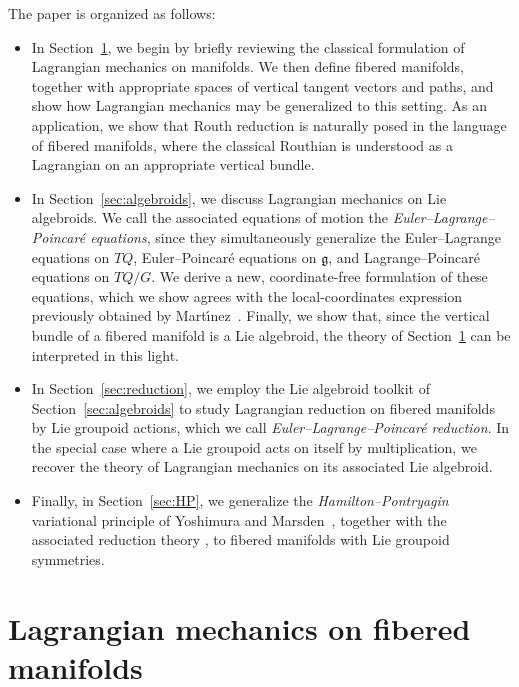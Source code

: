 \documentclass[10pt,a4paper]{amsart}
\numberwithin{equation}{section}
\begin{document}
The paper is organized as follows:
\begin{itemize}\itemsep=0pt
\item In Section~\ref{sec:EL}, we begin by brief\/ly reviewing the classical formulation of Lagrangian mechanics on manifolds. We then def\/ine f\/ibered manifolds, together with appropriate spaces of vertical tangent vectors and paths, and show how Lagrangian mechanics may be generalized to this setting. As an application, we show that Routh reduction is naturally posed in the language of f\/ibered manifolds, where the classical Routhian is understood as a Lagrangian on an appropriate vertical bundle.

\item In Section~\ref{sec:algebroids}, we discuss Lagrangian mechanics on Lie algebroids. We call the associated equations of motion the \emph{Euler--Lagrange--Poincar\'e equations}, since they simultaneously generalize the Euler--Lagrange equations on $ T Q $, Euler--Poincar\'e equations on $ \mathfrak{g} $, and Lagrange--Poincar\'e equations on $ T Q / G $. We derive a new, coordinate-free formulation of these equations, which we show agrees with the local-coordinates expression previously obtained by Mart\'{\i}nez~\cite{Martinez2001}. Finally, we show that, since the vertical bundle of a f\/ibered manifold is a Lie algebroid, the theory of Section~\ref{sec:EL} can be interpreted in this light.

\item In Section~\ref{sec:reduction}, we employ the Lie algebroid toolkit of Section~\ref{sec:algebroids} to study Lagrangian reduction on f\/ibered
 manifolds by Lie groupoid actions, which we call \emph{Euler--Lagrange--Poincar\'e reduction}. In the special case where a Lie groupoid acts on itself by multiplication, we recover the theory of Lagrangian mechanics on its associated Lie algebroid.

\item Finally, in Section~\ref{sec:HP}, we generalize the \emph{Hamilton--Pontryagin} variational principle of Yoshimura and Marsden~\cite{YoMa2006b}, together with the associated reduction theory \cite{YoMa2007}, to f\/ibered manifolds with Lie groupoid symmetries.
\end{itemize}

\section{Lagrangian mechanics on f\/ibered manifolds}\label{sec:EL}
\end{document}
